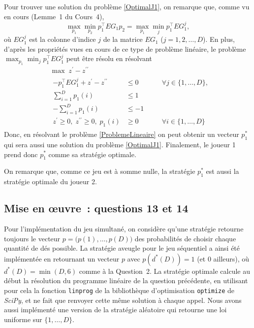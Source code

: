 \documentclass[a4paper,11pt]{amsart}
\theoremstyle{plain}
\begin{document}
Pour trouver une solution du problème \eqref{OptimalJ1}, on remarque que, comme vu en cours (Lemme~1 du Cours~4),
\[
\max_{p_1} \min_{p_2} p_1^\top EG_1 p_2 = \max_{p_1} \min_{j} p_1^\top EG_1^j,
\]
où $EG_1^j$ est la colonne d'indice $j$ de la matrice $EG_1$ ($j = 1, 2, \dotsc, D$). En plus, d'après les propriétés vues en cours de ce type de problème linéaire, le problème $\max_{p_1} \min_{j} p_1^\top EG_1^j$ peut être résolu en résolvant
\begin{equation}
\label{ProblemeLineaire}
\begin{aligned}
& \max\; z^\prime - z^{\prime\prime} \\
& \begin{aligned}
- p_1^\top EG_1^j + z^\prime - z^{\prime\prime} & \leq 0 & \quad & \forall j \in \{1, \dotsc, D\}, \\
\textstyle\sum_{i=1}^D p_1(i) & \leq 1 \\
\textstyle-\sum_{i=1}^D p_1(i) & \leq -1 \\
z^\prime \geq 0,\; z^{\prime\prime}\geq 0,\; p_1(i) & \geq 0 & & \forall i \in \{1, \dotsc, D\}
\end{aligned}
\end{aligned}
\end{equation}
Donc, en résolvant le problème \eqref{ProblemeLineaire} on peut obtenir un vecteur $p_1^\ast$ qui sera aussi une solution du problème \eqref{OptimalJ1}. Finalement, le joueur 1 prend donc $p_1^\ast$ comme sa stratégie optimale.

On remarque que, comme ce jeu est à somme nulle, la stratégie $p_1^\ast$ est aussi la stratégie optimale du joueur 2.

\subsection{Mise en \oe{}uvre~: questions 13 et 14}

Pour l'implémentation du jeu simultané, on considère qu'une stratégie retourne toujours le vecteur $p = \bigl(p(1), \dotsc, p(D)\bigr)$ des probabilités de choisir chaque quantité de dés possible. La stratégie aveugle pour le jeu séquentiel a ainsi été implémentée en retournant un vecteur $p$ avec $p(d^\ast(D)) = 1$ (et $0$ ailleurs), où $d^\ast(D) = \min(D, 6)$ comme à la Question~2. La stratégie optimale calcule au début la résolution du programme linéaire de la question précédente, en utilisant pour cela la fonction \texttt{linprog} de la bibliothèque d'optimisation \texttt{optimize} de \emph{SciPy}, et ne fait que renvoyer cette même solution à chaque appel. Nous avons aussi implémenté une version de la stratégie aléatoire qui retourne une loi uniforme sur $\{1, \dotsc, D\}$.
\end{document}
